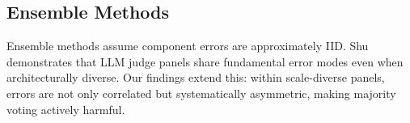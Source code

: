 \subsection{Ensemble Methods}

Ensemble methods assume component errors are approximately IID. Shu \cite{shu2026blind} demonstrates that LLM judge panels share fundamental error modes even when architecturally diverse. Our findings extend this: within scale-diverse panels, errors are not only correlated but systematically asymmetric, making majority voting actively harmful.
